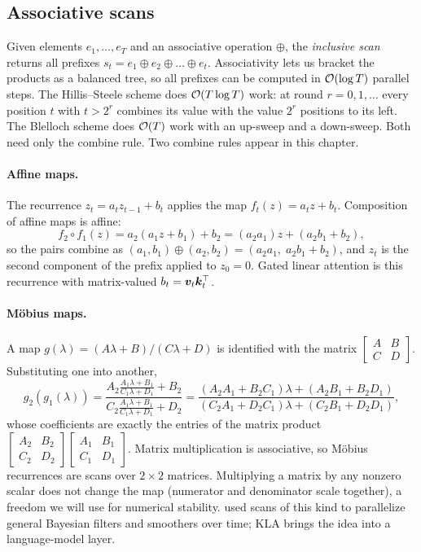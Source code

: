 \subsection{Associative scans}\label{sec:c08-scan}

Given elements $e_1,\dots,e_T$ and an associative operation $\oplus$, the \emph{inclusive scan}
returns all prefixes $s_t=e_1\oplus e_2\oplus\dots\oplus e_t$. Associativity lets us bracket the
products as a balanced tree, so all prefixes can be computed in $\mathcal{O}(\log T)$ parallel steps.
The Hillis--Steele scheme \citep{c08-hillis1986data} does $\mathcal{O}(T\log T)$ work: at round
$r=0,1,\dots$ every position $t$ with $t>2^r$ combines its value with the value $2^r$ positions to
its left. The Blelloch scheme \citep{c03-blelloch1990prefix} does $\mathcal{O}(T)$ work with an up-sweep and
a down-sweep. Both need only the combine rule. Two combine rules appear in this chapter.

\paragraph{Affine maps.} The recurrence $z_t=a_tz_{t-1}+b_t$ applies the map
$f_t(z)=a_tz+b_t$. Composition of affine maps is affine:
\[
  f_2\circ f_1(z) = a_2(a_1z+b_1)+b_2 = (a_2a_1)z+(a_2b_1+b_2),
\]
so the pairs combine as $(a_1,b_1)\oplus(a_2,b_2)=(a_2a_1,\;a_2b_1+b_2)$, and $z_t$ is the second
component of the prefix applied to $z_0=0$. Gated linear attention is this recurrence with
matrix-valued $b_t=\bm{v}_t\bm{k}_t^{\top}$.

\paragraph{M\"obius maps.} A map $g(\lambda)=(A\lambda+B)/(C\lambda+D)$ is identified with the
matrix $\left[\begin{smallmatrix}A&B\\C&D\end{smallmatrix}\right]$. Substituting one into another,
\[
  g_2(g_1(\lambda)) = \frac{A_2\frac{A_1\lambda+B_1}{C_1\lambda+D_1}+B_2}
                           {C_2\frac{A_1\lambda+B_1}{C_1\lambda+D_1}+D_2}
  = \frac{(A_2A_1+B_2C_1)\lambda+(A_2B_1+B_2D_1)}{(C_2A_1+D_2C_1)\lambda+(C_2B_1+D_2D_1)} ,
\]
whose coefficients are exactly the entries of the matrix product
$\left[\begin{smallmatrix}A_2&B_2\\C_2&D_2\end{smallmatrix}\right]
\left[\begin{smallmatrix}A_1&B_1\\C_1&D_1\end{smallmatrix}\right]$. Matrix multiplication is
associative, so M\"obius recurrences are scans over $2\times2$ matrices. Multiplying a matrix by
any nonzero scalar does not change the map (numerator and denominator scale together), a freedom
we will use for numerical stability.  used scans of this kind to
parallelize general Bayesian filters and smoothers over time; KLA brings the idea into a
language-model layer.

